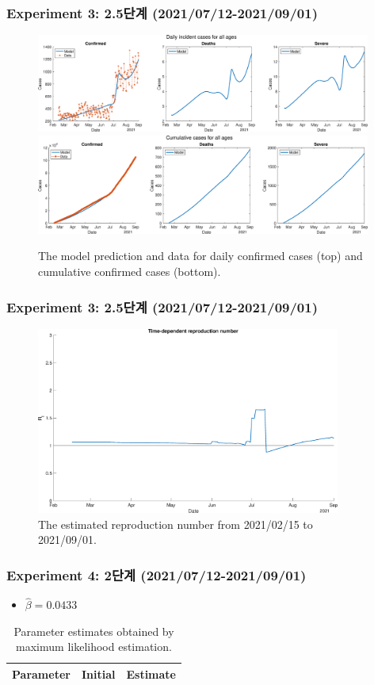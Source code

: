 \documentclass[aspectratio=169, 9pt, xcolor=dvipsnames]{beamer}
\begin{document}
	\begin{frame}\frametitle{Experiment 3: 2.5단계 (2021/07/12-2021/09/01)}
	    \begin{figure}
	    	\centering
	    	\includegraphics[width=11cm]{../results/estimate_sd_2nd_3/daily_all_age.eps}
	    	\includegraphics[width=11cm]{../results/estimate_sd_2nd_3/cumul_all_age.eps}
	    	\caption{The model prediction and data for daily confirmed cases (top) and cumulative confirmed cases (bottom).}
	    \end{figure}
	\end{frame}

	\begin{frame}\frametitle{Experiment 3: 2.5단계 (2021/07/12-2021/09/01)}
	    \begin{figure}
	    	\centering
	    	\includegraphics[width=10cm]{../results/estimate_sd_2nd_3/rep_num.eps}
	    	\caption{The estimated reproduction number from 2021/02/15 to 2021/09/01.}
	    \end{figure}
	\end{frame}

	\begin{frame}\frametitle{Experiment 4: 2단계 (2021/07/12-2021/09/01)}
	    \begin{itemize}
			\item $\hat{\beta} = 0.0433$
		\end{itemize}
	    \begin{table}
	    	\begin{tabular}{crr}
	    		\toprule
	    		\textbf{Parameter} & \textbf{Initial} & \textbf{Estimate} \\
	    		\midrule
	    		
	    		\bottomrule
	    	\end{tabular}
	    	\caption{Parameter estimates obtained by maximum likelihood estimation.}
	    \end{table}
	\end{frame}
\end{document}

